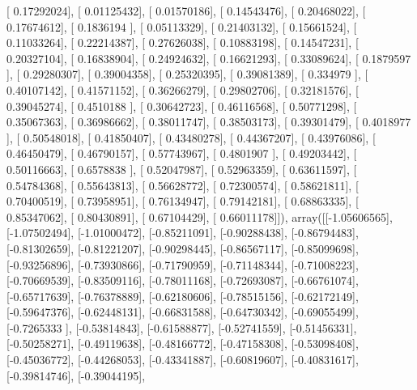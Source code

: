 \documentclass{article}
\begin{document}
       [ 0.17292024],
       [ 0.01125432],
       [ 0.01570186],
       [ 0.14543476],
       [ 0.20468022],
       [ 0.17674612],
       [ 0.1836194 ],
       [ 0.05113329],
       [ 0.21403132],
       [ 0.15661524],
       [ 0.11033264],
       [ 0.22214387],
       [ 0.27626038],
       [ 0.10883198],
       [ 0.14547231],
       [ 0.20327104],
       [ 0.16838904],
       [ 0.24924632],
       [ 0.16621293],
       [ 0.33089624],
       [ 0.1879597 ],
       [ 0.29280307],
       [ 0.39004358],
       [ 0.25320395],
       [ 0.39081389],
       [ 0.334979  ],
       [ 0.40107142],
       [ 0.41571152],
       [ 0.36266279],
       [ 0.29802706],
       [ 0.32181576],
       [ 0.39045274],
       [ 0.4510188 ],
       [ 0.30642723],
       [ 0.46116568],
       [ 0.50771298],
       [ 0.35067363],
       [ 0.36986662],
       [ 0.38011747],
       [ 0.38503173],
       [ 0.39301479],
       [ 0.4018977 ],
       [ 0.50548018],
       [ 0.41850407],
       [ 0.43480278],
       [ 0.44367207],
       [ 0.43976086],
       [ 0.46450479],
       [ 0.46790157],
       [ 0.57743967],
       [ 0.4801907 ],
       [ 0.49203442],
       [ 0.50116663],
       [ 0.6578838 ],
       [ 0.52047987],
       [ 0.52963359],
       [ 0.63611597],
       [ 0.54784368],
       [ 0.55643813],
       [ 0.56628772],
       [ 0.72300574],
       [ 0.58621811],
       [ 0.70400519],
       [ 0.73958951],
       [ 0.76134947],
       [ 0.79142181],
       [ 0.68863335],
       [ 0.85347062],
       [ 0.80430891],
       [ 0.67104429],
       [ 0.66011178]]), array([[-1.05606565],
       [-1.07502494],
       [-1.01000472],
       [-0.85211091],
       [-0.90288438],
       [-0.86794483],
       [-0.81302659],
       [-0.81221207],
       [-0.90298445],
       [-0.86567117],
       [-0.85099698],
       [-0.93256896],
       [-0.73930866],
       [-0.71790959],
       [-0.71148344],
       [-0.71008223],
       [-0.70669539],
       [-0.83509116],
       [-0.78011168],
       [-0.72693087],
       [-0.66761074],
       [-0.65717639],
       [-0.76378889],
       [-0.62180606],
       [-0.78515156],
       [-0.62172149],
       [-0.59647376],
       [-0.62448131],
       [-0.66831588],
       [-0.64730342],
       [-0.69055499],
       [-0.7265333 ],
       [-0.53814843],
       [-0.61588877],
       [-0.52741559],
       [-0.51456331],
       [-0.50258271],
       [-0.49119638],
       [-0.48166772],
       [-0.47158308],
       [-0.53098408],
       [-0.45036772],
       [-0.44268053],
       [-0.43341887],
       [-0.60819607],
       [-0.40831617],
       [-0.39814746],
       [-0.39044195],
\end{document}
